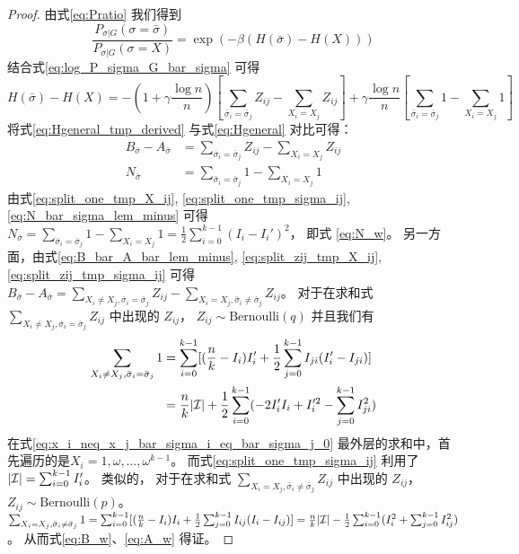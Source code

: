 \begin{proof}
  由式\eqref{eq:Pratio} 我们得到
  \begin{equation}
    \frac{P_{\sigma |G } (\sigma = \bar{\sigma})}
    {P_{\sigma |G } (\sigma = X)}
    = \exp(-\beta(H(\bar{\sigma})
    - H(X)))
  \end{equation}
  结合式\eqref{eq:log_P_sigma_G_bar_sigma}
  可得
  \begin{equation}\label{eq:Hgeneral_tmp_derived}
    H(\bar{\sigma}) - H(X)=
    -\left(1 + \gamma \frac{ \log n}{n}
    \right)
    \left[
      \sum_{\bar{\sigma}_i = \bar{\sigma}_j}Z_{ij} - \sum_{X_i = X_j}Z_{ij}
      \right]
    + \gamma\frac{ \log n}{n}
    \left[\sum_{\bar{\sigma}_i = \bar{\sigma}_j}1 - \sum_{X_i = X_j}1
    \right]
    \end{equation}
  将式\eqref{eq:Hgeneral_tmp_derived} 与式\eqref{eq:Hgeneral}
  对比可得：
  \begin{align}
    B_{\bar{\sigma}} - A_{\bar{\sigma}} &=
    \sum_{\bar{\sigma}_i = \bar{\sigma}_j}Z_{ij}
    - \sum_{X_i = X_j}Z_{ij}
    \label{eq:B_bar_A_bar_lem_minus}\\
    N_{\bar{\sigma}} &=
    \sum_{\bar{\sigma}_i = \bar{\sigma}_j} 1  -\sum_{X_i = X_j} 1
    \label{eq:N_bar_sigma_lem_minus}
  \end{align}
  由式\eqref{eq:split_one_tmp_X_ij},
  \eqref{eq:split_one_tmp_sigma_ij}, 
  \eqref{eq:N_bar_sigma_lem_minus} 可得
  $N_{\bar{\sigma}} = \sum_{\bar{\sigma}_i = \bar{\sigma}_j} 1  -\sum_{X_i = X_j} 1 = \frac{1}{2}\sum_{i=0}^{k-1} (I_i - I_i')^2 $，
  即式 \eqref{eq:N_w}。
	另一方面，由式\eqref{eq:B_bar_A_bar_lem_minus},
  \eqref{eq:split_zij_tmp_X_ij}, 
  \eqref{eq:split_zij_tmp_sigma_ij}
  可得 $B_{\bar{\sigma}} - A_{\bar{\sigma}} = \sum_{X_i \neq X_j, \bar{\sigma}_i = \bar{\sigma}_j} Z_{ij} - \sum_{X_i = X_j, \bar{\sigma}_i \neq \bar{\sigma}_j} Z_{ij}$。
	对于在求和式 $\sum_{X_i \neq X_j, \bar{\sigma}_i = \bar{\sigma}_j} Z_{ij}$
  中出现的 $Z_{ij}$， $Z_{ij} \sim \textrm{Bernoulli}(q)$
  并且我们有
  \begin{align}
  \sum_{X_i \neq X_j, \bar{\sigma}_i = \bar{\sigma}_j} 1 
  &= \sum_{i=0}^{k-1}[(\frac{n}{k} - I_i) I_i' + \frac{1}{2} \sum_{j=0}^{k-1} I_{ji}(I'_i - I_{ji}) ] 
  \label{eq:x_i_neq_x_j_bar_sigma_i_eq_bar_sigma_j_0}\\
	&=\frac{n}{k}|\mathcal{I}| + \frac{1}{2}\sum_{i=0}^{k-1}  (-2 I'_i I_i  + I'^2_i - \sum_{j=0}^{k-1} I^2_{ji}) 
  \label{eq:x_i_neq_x_j_bar_sigma_i_eq_bar_sigma_j_1}
  \end{align}
  在式\eqref{eq:x_i_neq_x_j_bar_sigma_i_eq_bar_sigma_j_0}
  最外层的求和中，首先遍历的是$X_i=1, \omega, \dots, \omega^{k-1}$。  
  而式\eqref{eq:split_one_tmp_sigma_ij}
  利用了
  $|\mathcal{I}| = \sum_{i=0}^{k-1} I'_i$。
  类似的，
  对于在求和式 $\sum_{X_i = X_j, \bar{\sigma}_i \neq \bar{\sigma}_j} Z_{ij}$
  中出现的 $Z_{ij}$， $Z_{ij} \sim \textrm{Bernoulli}(p)$。
	$\sum_{X_i = X_j, \bar{\sigma}_i \neq \bar{\sigma}_j} 1
	= \sum_{i=0}^{k-1}[(\frac{n}{k} - I_i) I_i + \frac{1}{2} \sum_{j=0}^{k-1} I_{ij}(I_i - I_{ij}) ] 
	= \frac{n}{k}|\mathcal{I}| - \frac{1}{2}\sum_{i=0}^{k-1}  (I^2_i + \sum_{j=0}^{k-1} I^2_{ij})$。
  从而式\eqref{eq:B_w}、\eqref{eq:A_w} 得证。
\end{proof}

